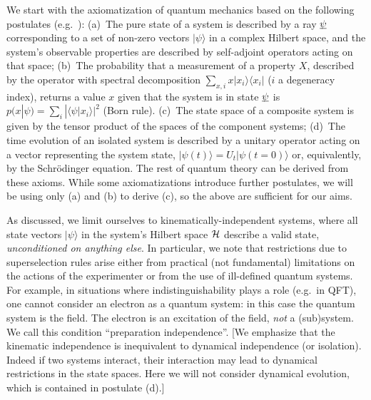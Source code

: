 \documentclass[aps,prl,amsmath,amssymb,twocolumn,nofootinbib]{revtex4}
\theoremstyle{plain}
\theoremstyle{definition}
\theoremstyle{remark}
\newcommand{\pj}[1] {\underbar{$#1$}}
\def\>{\rangle}
\def\<{\langle}
\def\commentg#1{ [{\bf Comment Gabriele:} {\sf #1}]}
\def\togli#1{}
\begin{document}
	We start with the axiomatization of quantum mechanics based on the following
	postulates (e.g.~\cite{ozawa,masanes,wootters,nielsenchuang}): (a)~The pure state of a
	system is described by a ray $\pj{\psi}$ corresponding to a set of
	non-zero vectors $|\psi\>$ in a complex Hilbert space, and the
	system's observable properties are described by self-adjoint operators
	acting on that space; (b)~The probability that a measurement of a
	property $X$, described by the operator with spectral decomposition
	$\sum_{x,i}x|x_i\>\<x_i|$ ($i$ a degeneracy index), returns a value
	$x$ given that the system is in state $\pj{\psi}$ is
	$p(x|\psi)=\sum_i|\<\psi|x_i\>|^2$ (Born rule). (c)~The state
	space of a composite system is given by the tensor product of the
	spaces of the component systems; (d)~The time evolution of an isolated
	system is described by a unitary operator acting on a vector
	representing the system state, $|\psi({t})\>=U_{t}|\psi({t}=0)\>$ or,
	equivalently, by the Schr\"odinger equation. The rest of quantum
	theory can be derived from these axioms. While some axiomatizations
	introduce further postulates, we will be using only (a) and (b) to
	derive (c), so the above are sufficient for our aims.
	
	\togli{This axiomatization implicitly contains a definition of
		``quantum system'' which is crucial for what follows, so we need to
		clarify the assumptions that it contains. We will use the following
		definition for a quantum
		system\togli{$\stackon[1pt]={\mbox{\tiny
					def}}$}$\stackrel{\mbox{\tiny def}}=${\em ``a quantum degree
			of freedom with $d$ (possibly discrete, or continuous, infinite)
			mutually exclusive (commuting) values for each of its properties.
			Its mathematical description is through a Hilbert space of
			dimension $d$ which contains all the states that describe the
			values of its possible properties. In accordance with the
			postulate (a), these values correspond to a basis of the space,
			given by the eigenvectors of the observable corresponding to that
			property''}. \commentg{We may have to revise to be more clear.
			Where is this used?} } As discussed, we limit ourselves to
	kinemati\-cal\-ly-inde\-pen\-dent systems, where all state vectors
	$|\psi\>$ in the system's Hilbert space $\cal H$ describe a valid
	state, {\em unconditioned on anything else}. In particular, we note
	that restrictions due to superselection rules arise either from
	practical (not fundamental) limitations on the actions of the
	experimenter \cite{susskind,zanardi,zanardilloyd} or from the use of
	ill-defined quantum systems. For example, in situations where
	indistinguishability plays a role (e.g.~in QFT), one cannot consider
	an electron as a quantum system: in this case the quantum system is
	the field. The electron is an excitation of the field, {\em not} a
	(sub)system. We call this condition ``preparation independence''.  [We
	emphasize that the kinematic independence is inequivalent to dynamical
	independence (or isolation).  Indeed if two systems interact, their
	interaction may lead to dynamical restrictions in the state spaces.
	Here we will not consider dynamical evolution, which is contained in
	postulate (d).]
	
\end{document}
